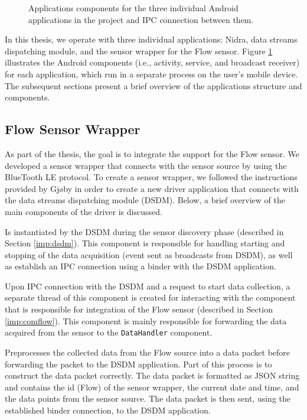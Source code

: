 \begin{figure}
    \caption{Applications components for the three individual Android applications in the project and IPC connection between them.}
    \label{fig:app_components}
\end{figure}


In this thesis, we operate with three individual applications: Nidra, data streams dispatching module, and the sensor wrapper for the Flow sensor. Figure \ref{fig:app_components} illustrates the Android components (i.e., activity, service, and broadcast receiver) for each application, which run in a separate process on the user's mobile device. The subsequent sections present a brief overview of the applications structure and components.


\subsection{Flow Sensor Wrapper}\label{imp:flowsensor}
As part of the thesis, the goal is to integrate the support for the Flow sensor. We developed a sensor wrapper that connects with the sensor source by using the BlueTooth LE protocol. To create a sensor wrapper, we followed the instructions provided by Gjøby \cite{gjoby} in order to create a new driver application that connects with the data streams dispatching module (DSDM). Below, a brief overview of the main components of the driver is discussed.

\begin{description}[font=\normalfont\itshape]
    \item[WrapperService:] Is instantiated by the DSDM during the sensor discovery phase (described in Section \ref{imp:dsdm}). This component is responsible for handling starting and stopping of the data acquisition (event sent as broadcasts from DSDM), as well as establish an IPC connection using a binder with the DSDM application. 
    \item[CommunicationHandler:] Upon IPC connection with the DSDM and a request to start data collection, a separate thread of this component is created for interacting with the component that is responsible for integration of the Flow sensor (described in Section \ref{imp:comflow}). This component is mainly responsible for forwarding the data acquired from the sensor to the \verb|DataHandler| component. 
    \item[DataHandler:] Preprocesses the collected data from the Flow source into a data packet before forwarding the packet to the DSDM application. Part of this process is to construct the data packet correctly. The data packet is formatted as JSON string and contains the id (Flow) of the sensor wrapper, the current date and time, and the data points from the sensor source. The data packet is then sent, using the established binder connection, to the DSDM application.
\end{description}

